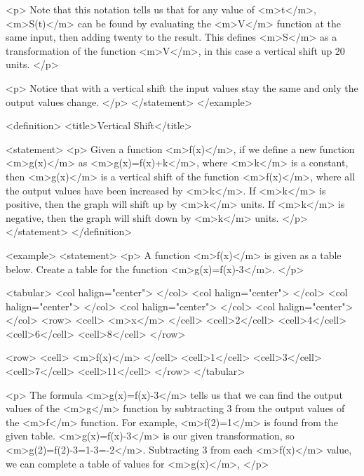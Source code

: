                 <p>
                    Note that this notation tells us that for any value of <m>t</m>, <m>S(t)</m> can be found by evaluating the <m>V</m> function at the same input, then adding twenty to the result.
                    This defines <m>S</m> as a transformation of the function <m>V</m>, in this case a vertical shift up 20 units.
                </p>

                <p>
                    Notice that with a vertical shift the input values stay the same and only the output values change.
                </p>
            </statement>
        </example>

        <definition>
            <title>Vertical Shift</title>

            <statement>
                <p>
                    Given a function <m>f(x)</m>, if we define a new function <m>g(x)</m> as <m>g(x)=f(x)+k</m>, where <m>k</m> is a constant, then <m>g(x)</m> is a vertical shift of the function <m>f(x)</m>, where all the output values have been increased by <m>k</m>.
                    If <m>k</m> is positive, then the graph will shift up by <m>k</m> units.
                    If <m>k</m> is negative, then the graph will shift down by <m>k</m> units.
                </p>
            </statement>
        </definition>

        <example>
            <statement>
                <p>
                    A function <m>f(x)</m> is given as a table below.
                    Create a table for the function <m>g(x)=f(x)-3</m>.
                </p>

                <tabular>
                    <col halign="center"> </col> <col halign="center"> </col> <col halign="center"> </col> <col halign="center"> </col> <col halign="center"> </col>
                    <row>
                        <cell> <m>x</m> </cell>
                        <cell>2</cell>
                        <cell>4</cell>
                        <cell>6</cell>
                        <cell>8</cell>
                    </row>

                    <row>
                        <cell> <m>f(x)</m> </cell>
                        <cell>1</cell>
                        <cell>3</cell>
                        <cell>7</cell>
                        <cell>11</cell>
                    </row>
                </tabular>

                <p>
                    The formula <m>g(x)=f(x)-3</m> tells us that we can find the output values of the <m>g</m> function by subtracting 3 from the output values of the <m>f</m> function.
                    For example, <m>f(2)=1</m> is found from the given table.
                    <m>g(x)=f(x)-3</m> is our given transformation, so <m>g(2)=f(2)-3=1-3=-2</m>.
                    Subtracting 3 from each <m>f(x)</m> value, we can complete a table of values for <m>g(x)</m>,
                </p>

